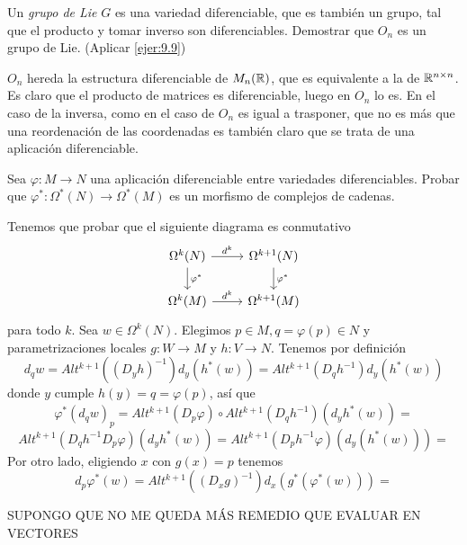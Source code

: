 \documentclass[twoside]{article}
\begin{document}
\begin{ejercicio}{9.10}
Un \emph{grupo de Lie} $G$ es una variedad diferenciable, que es también un grupo, tal que el producto y tomar inverso son diferenciables. Demostrar que $O_n$ es un grupo de Lie. (Aplicar \ref{ejer:9.9})
\end{ejercicio}
\begin{solucion}
$O_n$ hereda la estructura diferenciable de $M_n(\mathbb{R})$, que es equivalente a la de $\mathbb{R}^{n\times n}$. Es claro que el producto de matrices es diferenciable, luego en $O_n$ lo es. En el caso de la inversa, como en el caso de $O_n$ es igual a trasponer, que no es más que una reordenación de las coordenadas es también claro que se trata de una aplicación diferenciable.
\end{solucion}
\newpage

\begin{ejercicio}{9.11}
Sea $\varphi:M\to N$ una aplicación diferenciable entre variedades diferenciables. Probar que $\varphi^*:\Omega^*(N)\to\Omega^*(M)$ es un morfismo de complejos de cadenas.
\end{ejercicio}
\begin{solucion}
Tenemos que probar que el siguiente diagrama es conmutativo 
\[
\begin{tikzcd}
\Omega^k(N)\arrow[r,"d^k"]\arrow[d,"\varphi^*"] & \Omega^{k+1}(N)\arrow[d,"\varphi^*"]\\
\Omega^k(M)\arrow[r, "d^k"] & \Omega^{k+1}(M)
\end{tikzcd}
\]
para todo $k$. Sea $w\in\Omega^k(N)$. Elegimos $p\in M,q=\varphi(p)\in N$ y parametrizaciones locales $g:W\to M$ y $h:V\to N$. Tenemos por definición
\[
d_qw=Alt^{k+1}((D_yh)^{-1})d_y(h^*(w))=Alt^{k+1}(D_qh^{-1})d_y(h^*(w))
\]
donde $y$ cumple $h(y)=q=\varphi(p)$, así que
\[
\varphi^*(d_qw)_p=Alt^{k+1}(D_p\varphi)\circ Alt^{k+1}(D_qh^{-1})(d_yh^*(w))=
\]
\[
Alt^{k+1}(D_qh^{-1}D_p\varphi)(d_yh^*(w))=Alt^{k+1}(D_ph^{-1}\varphi)(d_y(h^*(w)))=
\]
% 
Por otro lado, 
eligiendo $x$ con  $g(x)=p$ tenemos
\[
d_p\varphi^*(w)=Alt^{k+1}((D_xg)^{-1})d_x(g^*(\varphi^*(w)))=
\]

SUPONGO QUE NO ME QUEDA MÁS REMEDIO QUE EVALUAR EN VECTORES
\end{solucion}
\end{document}
